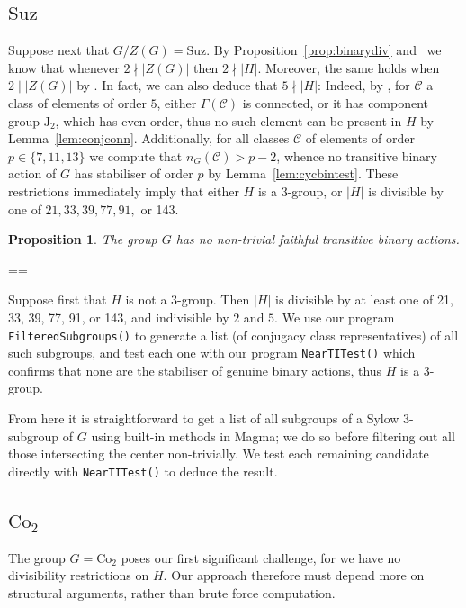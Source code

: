 \documentclass[11pt, a4paper]{amsart}
\makeatletter
\newcommand\C{\mathcal{C}}
\newcommand{\magma}{{\sc Magma}}
\newtheorem{prop}[thm]{Proposition}
\renewcommand{\proofname}{Proof}
\renewenvironment{proof}[1][\proofname]{\par
  \pushQED{\qed}  \normalfont \partopsep=\z@skip \topsep=\z@skip
  \trivlist
  \item[\hskip\labelsep
        \scshape
    #1\@addpunct{.}]\ignorespaces
}{  \popQED\endtrivlist\@endpefalse
}
\makeatother
\begin{document}
\subsection{$\mathrm{Suz}$}
Suppose next that $G/Z(G)=\mathrm{Suz}$. By Proposition~\ref{prop:binarydiv} and~\cite[Lemma 2.12]{CDP} we know that whenever $2\nmid |Z(G)|$ then $2\nmid |H|$. Moreover, the same holds when $2\mid |Z(G)|$ by \cite[Theorem 1.1]{CDP}. In fact, we can also deduce that $5\nmid |H|$: Indeed, by \cite[Proposition 3.3]{CDP}, for $\mathcal{C}$ a class of elements of order $5$, either $\Gamma(\mathcal{C})$ is connected, or it has component group $\mathrm{J}_2$, which has even order, thus no such element can be present in $H$ by Lemma~\ref{lem:conjconn}. Additionally, for all classes $\C$ of elements of order $p\in\{7,11,13\}$ we compute that $n_G(\C)> p-2$, whence no transitive binary action of $G$ has stabiliser of order $p$ by Lemma~\ref{lem:cycbintest}. These restrictions immediately imply that either $H$ is a 3-group, or $|H|$ is divisible by one of $21,33,39,77,91,$ or 143.
  \begin{prop}\label{prop:suzclass}
    The group $G$ has no non-trivial faithful transitive binary actions.
\end{prop}
\begin{proof}
    Suppose first that $H$ is not a 3-group. Then $|H|$ is divisible by at least one of 21, 33, 39, 77, 91, or 143, and indivisible by $2$ and $5$. We use our program {\tt FilteredSubgroups()} to generate a list (of conjugacy class representatives) of all such subgroups, and test each one with our program {\tt NearTITest()} which confirms that none are the stabiliser of genuine binary actions, thus $H$ is a 3-group.

    From here it is straightforward to get a list of all subgroups of a Sylow 3-subgroup of $G$ using built-in methods in \magma; we do so before filtering out all those intersecting the center non-trivially. We test each remaining candidate directly with {\tt NearTITest()} to deduce the result.
\end{proof}

\subsection{$\mathrm{Co}_2$} The group $G=\mathrm{Co}_2$ poses our first significant challenge, for we have no divisibility restrictions on $H$. Our approach therefore must depend more on structural arguments, rather than brute force computation.
\end{document}
